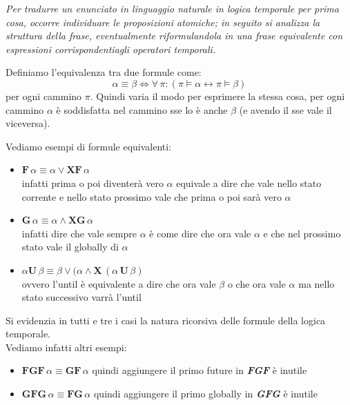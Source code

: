 \textit{Per tradurre un enunciato in linguaggio naturale in logica temporale per
  prima cosa, occorre individuare le proposizioni atomiche; in seguito si
  analizza la struttura della frase, eventualmente riformulandola in una frase
  equivalente con espressioni corrispondentiagli operatori temporali.}\\
\begin{definizione}
  Definiamo l'equivalenza tra due formule come:
  \[\alpha\equiv \beta\iff \forall\,\pi:(\pi\vDash\alpha\leftrightarrow\pi\vDash
    \beta)\]
  per ogni cammino $\pi$. Quindi varia il modo per esprimere la stessa cosa, per
  ogni cammino $\alpha$ è soddisfatta nel cammino sse lo è anche $\beta$ (e
  avendo il sse vale il viceversa).
\end{definizione}
\begin{esempio}
  Vediamo esempi di formule equivalenti:
  \begin{itemize}
    \item $\mathbf{F}\,\alpha\equiv\alpha\lor\mathbf{XF}\,\alpha$\\
    infatti prima o poi diventerà vero $\alpha$ equivale a dire che vale nello
    stato corrente e nello stato prossimo vale che prima o poi sarà vero
    $\alpha$ 
    \item $\mathbf{G}\,\alpha\equiv\alpha\land\mathbf{XG}\,\alpha$\\
    infatti dire che vale sempre $\alpha$ è come dire che ora vale $\alpha$ e
    che nel prossimo stato vale il globally di $\alpha$
    \item $\alpha\mathbf{U}\,\beta\equiv\beta\lor(\alpha\land
    \mathbf{X}\,(\alpha\,\mathbf{U}\,\beta)$ \\
    ovvero l'until è equivalente a dire che ora vale $\beta$ o che ora vale
    $\alpha$ ma nello stato successivo varrà l'until
  \end{itemize}
  Si evidenzia in tutti e tre i casi la natura ricorsiva delle formule della
  logica temporale.\\
  Vediamo infatti altri esempi:
  \begin{itemize}
    \item $\mathbf{FGF}\,\alpha\equiv\mathbf{GF}\,\alpha$
    quindi aggiungere il primo future in \textbf{\textit{FGF}} è inutile
    \item $\mathbf{GFG}\,\alpha\equiv\mathbf{FG}\,\alpha$
    quindi aggiungere il primo globally in \textbf{\textit{GFG}} è inutile   
  \end{itemize}
\end{esempio}

